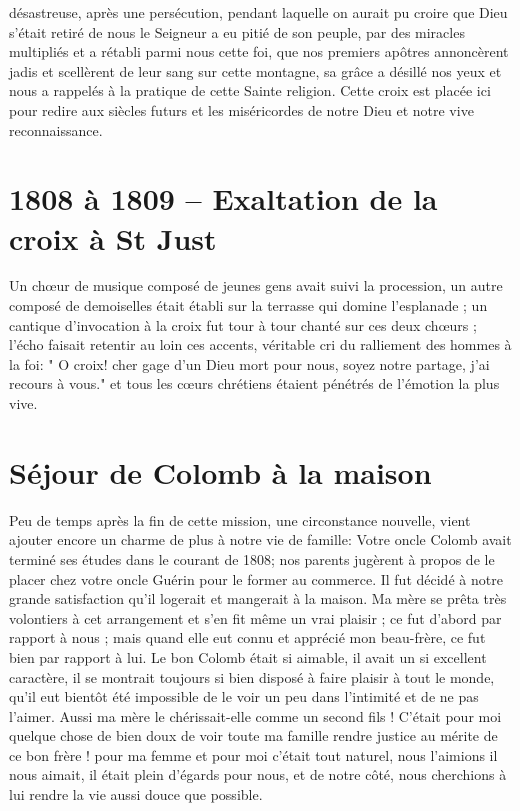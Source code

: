 \documentclass[11pt,a4paper]{report}
\begin{document}
désastreuse, après une persécution, pendant laquelle on aurait pu croire que Dieu s'était retiré de nous le Seigneur a eu pitié de son peuple, par des miracles multipliés et a rétabli parmi nous cette foi, que nos premiers apôtres annoncèrent jadis et scellèrent de leur sang sur cette montagne, sa grâce a désillé nos yeux et nous a rappelés à la pratique de cette Sainte religion. Cette croix est placée ici pour redire aux siècles futurs et les miséricordes de notre Dieu et notre vive reconnaissance.

\section*{1808 à 1809 -- Exaltation de la croix à St Just}

Un chœur de musique composé de jeunes gens avait suivi la procession, un autre composé de demoiselles était établi sur la terrasse qui domine l'esplanade ; un cantique d'invocation à la croix fut tour à tour chanté sur ces deux chœurs ; l'écho faisait retentir au loin ces accents, véritable cri du ralliement des hommes à la foi: " O croix! cher gage d'un Dieu mort pour nous, soyez notre partage, j'ai recours à vous." et tous les cœurs chrétiens étaient pénétrés de l'émotion la plus vive.

\section*{Séjour de Colomb à la maison}

Peu de temps après la fin de cette mission, une circonstance nouvelle, vient ajouter encore un charme de plus à notre vie de famille: Votre oncle Colomb avait terminé ses études dans le courant de 1808; nos parents jugèrent à propos de le placer chez votre oncle Guérin pour le former au commerce. Il fut décidé à notre grande satisfaction qu'il logerait et mangerait à la maison. Ma mère se prêta très volontiers à cet arrangement et s'en fit même un vrai plaisir ; ce fut d'abord par rapport à nous ; mais quand elle eut connu et apprécié mon beau-frère, ce fut bien par rapport à lui. Le bon Colomb était si aimable, il avait un si excellent caractère, il se montrait toujours si bien disposé à faire plaisir à tout le monde, qu'il eut bientôt été impossible de le voir un peu dans l'intimité et de ne pas l'aimer. Aussi ma mère le chérissait-elle comme un second fils ! C'était pour moi quelque chose de bien doux de voir toute ma famille rendre justice au mérite de ce bon frère ! pour ma femme et pour moi c'était tout naturel, nous l'aimions il nous aimait, il était plein d'égards pour nous, et de notre côté, nous cherchions à lui rendre la vie aussi douce que possible.
\end{document}
